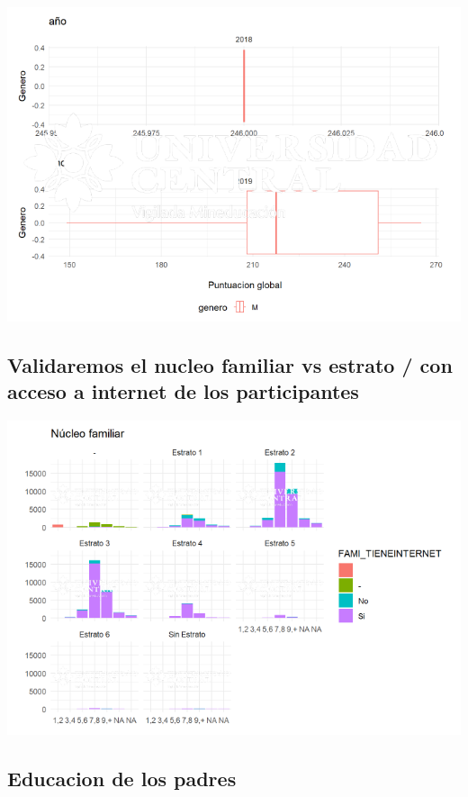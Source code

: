 \documentclass{article}
\begin{document}
\begin{center}
\includegraphics[scale=0.5]{Captura16.PNG} 
\end{center}

\subsection{Validaremos el nucleo familiar vs estrato / con acceso a internet de los participantes}

\begin{center}
\includegraphics[scale=0.5]{Captura17.PNG} 
\end{center}

\subsection{Educacion de los padres}
\end{document}
